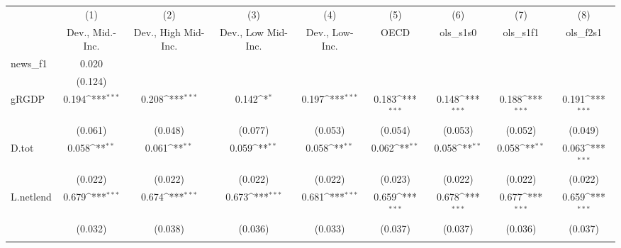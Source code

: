 {
\def\sym#1{\ifmmode^{#1}\else\(^{#1}\)\fi}
\begin{tabular}{l*{8}{c}}
\toprule
            &\multicolumn{1}{c}{(1)}&\multicolumn{1}{c}{(2)}&\multicolumn{1}{c}{(3)}&\multicolumn{1}{c}{(4)}&\multicolumn{1}{c}{(5)}&\multicolumn{1}{c}{(6)}&\multicolumn{1}{c}{(7)}&\multicolumn{1}{c}{(8)}\\
            &\multicolumn{1}{c}{Dev., Mid.-Inc.}&\multicolumn{1}{c}{Dev., High Mid-Inc.}&\multicolumn{1}{c}{Dev., Low Mid-Inc.}&\multicolumn{1}{c}{Dev., Low-Inc.}&\multicolumn{1}{c}{OECD}&\multicolumn{1}{c}{ols\_s1s0}&\multicolumn{1}{c}{ols\_s1f1}&\multicolumn{1}{c}{ols\_f2s1}\\
\midrule
news\_f1     &       0.020         &                     &                     &                     &                     &                     &                     &                     \\
            &     (0.124)         &                     &                     &                     &                     &                     &                     &                     \\
\addlinespace
gRGDP       &       0.194\sym{***}&       0.208\sym{***}&       0.142\sym{*}  &       0.197\sym{***}&       0.183\sym{***}&       0.148\sym{***}&       0.188\sym{***}&       0.191\sym{***}\\
            &     (0.061)         &     (0.048)         &     (0.077)         &     (0.053)         &     (0.054)         &     (0.053)         &     (0.052)         &     (0.049)         \\
\addlinespace
D.tot       &       0.058\sym{**} &       0.061\sym{**} &       0.059\sym{**} &       0.058\sym{**} &       0.062\sym{**} &       0.058\sym{**} &       0.058\sym{**} &       0.063\sym{***}\\
            &     (0.022)         &     (0.022)         &     (0.022)         &     (0.022)         &     (0.023)         &     (0.022)         &     (0.022)         &     (0.022)         \\
\addlinespace
L.netlend   &       0.679\sym{***}&       0.674\sym{***}&       0.673\sym{***}&       0.681\sym{***}&       0.659\sym{***}&       0.678\sym{***}&       0.677\sym{***}&       0.659\sym{***}\\
            &     (0.032)         &     (0.038)         &     (0.036)         &     (0.033)         &     (0.037)         &     (0.037)         &     (0.036)         &     (0.037)         \\
\addlinespace

\end{tabular}}

